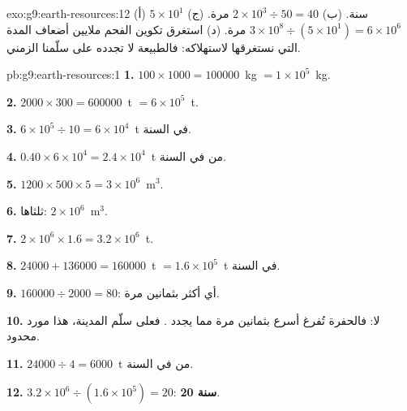 \begin{solution}{exo:g9:earth-resources:12}
(أ) $5 \times 10^1$ سنة. (ب) $2 \times 10^3 \div 50 = 40$ مرة. (ج) $3
\times 10^8 \div (5 \times 10^1) = 6 \times 10^6$ مرة. (د) استغرق
تكوين الفحم ملايين أضعاف المدة التي نستغرقها لاستهلاكه: فالطبيعة لا
تجدده على سلّمنا الزمني.
\end{solution}

\begin{solution}{pb:g9:earth-resources:1}
\textbf{1.} $100 \times 1000 = \num{100000}$~kg $= 1 \times 10^5$~kg.

\textbf{2.} $2000 \times 300 = \num{600000}$~t $= 6 \times 10^5$~t.

\textbf{3.} $6 \times 10^5 \div 10 = 6 \times 10^4$~t في السنة.

\textbf{4.} $0.40 \times 6 \times 10^4 = 2.4 \times 10^4$~t من  في
السنة.

\textbf{5.} $1200 \times 500 \times 5 = 3 \times 10^6$~m$^3$.

\textbf{6.} ثلثاها: $2 \times 10^6$~m$^3$.

\textbf{7.} $2 \times 10^6 \times 1.6 = 3.2 \times 10^6$~t.

\textbf{8.} $\num{24000} + \num{136000} = \num{160000}$~t $= 1.6 \times
10^5$~t في السنة.

\textbf{9.} $\num{160000} \div 2000 = 80$: أي أكثر بثمانين مرة.

\textbf{10.} لا: فالحفرة تُفرغ أسرع بثمانين مرة مما يجدد  .
فعلى سلّم المدينة، هذا  مورد محدود.

\textbf{11.} $\num{24000} \div 4 = \num{6000}$~t من  في السنة.

\textbf{12.} $3.2 \times 10^6 \div (1.6 \times 10^5) = 20$: \textbf{20 سنة}.
\end{solution}

